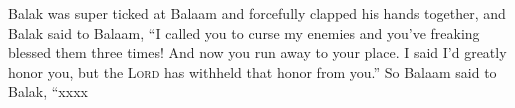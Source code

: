 
\begin{inparaenum}
    
    \pvbb{}{}%
    
    
    \pvbb{}{}%
    
    
    
    \pvbb{}{}%
    
    
    \pvbb{}{}%
    
    
    \pvcc{}{}{}%
    
    
    \pvbb{}{}%
    
     Balak was super ticked at Balaam and forcefully clapped his hands together, and Balak said to Balaam, ``I called you to curse my enemies and you've freaking blessed them three times!%
     And now you run away to your place. I said I'd greatly honor you, but the \textsc{Lord} has withheld that honor from you.''%
     So Balaam said to Balak, ``xxxx%
    
    \pvbb{}{}%
    
    
    \pvbb{}{}%
    
    
    \pvbb{}{}%
    
    \pvbb{}{}%
    
    
    
    \pvba{}%
    
    
    \pvbb{}{}%
    
    
    \pvbb{}{}%
    
    
    
    
    \pvbb{}{}%
    
\end{inparaenum}
